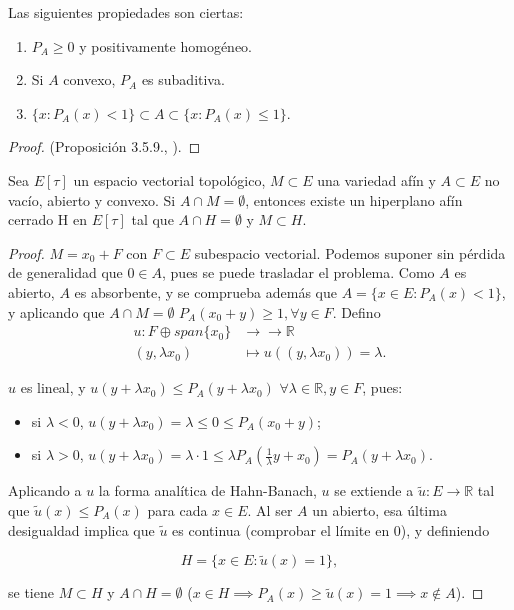 \begin{proposition}
  Las siguientes propiedades son ciertas:
  \begin{enumerate}
    \item $P_A\ge 0$ y positivamente homogéneo.
    \item Si $A$ convexo, $P_A$ es subaditiva.
    \item $\{x:P_A(x)<1\} \subset A \subset \{x:P_A(x)\le 1\}  $.
  \end{enumerate}
\end{proposition}

\begin{proof}
  (Proposición 3.5.9., \cite{cascales2012}).
\end{proof}


\begin{theorem}[Mazur]
  Sea $E[\tau]$ un espacio vectorial topológico, $M\subset E$ una variedad
  afín y $A\subset E$ no vacío, abierto y convexo. Si $A\cap M= \emptyset$,
  entonces existe un hiperplano afín cerrado H en $E[\tau]$ tal que $A\cap
  H=\emptyset$ y $M\subset H$.
\end{theorem}

\begin{proof}
  $M=x_0+F$ con $F\subset E$ subespacio vectorial. Podemos suponer sin pérdida
  de generalidad que $0\in A$, pues se puede trasladar el problema. Como $A$ es
  abierto, $A$ es absorbente, y se comprueba además que $A=\{x\in E:P_A(x)<1\}
  $, y aplicando que $A\cap M=\emptyset$ $P_A(x_0+y)\ge  1, \forall y\in F$.
  Defino 
  \begin{align*}
    u: F\oplus span \{x_0\}  &\longrightarrow \to \mathbb{R} \\
    (y,\lambda x_0) &\longmapsto u((y,\lambda x_0)) = \lambda
  .\end{align*}
  
  $u$ es lineal, y $u(y+\lambda x_0) \le P_A(y+\lambda x_0)$ $\forall \lambda\in
  \mathbb{R},y\in F$, pues:

  \begin{itemize}
    \item si $\lambda < 0$, $u(y+\lambda x_0)=\lambda\le 0\le P_A(x_0+y)$;
    \item si $\lambda > 0$, $u(y+\lambda x_0)=\lambda \cdot 1 \le \lambda
      P_A(\frac{1}{\lambda}y+x_0)=P_A(y+\lambda x_0)$.
  \end{itemize}

  Aplicando a $u$ la forma analítica de Hahn-Banach, $u$ se extiende a
  $\tilde{u}:E\to \mathbb{R}$ tal que $\tilde{u}(x)\le P_A(x)$ para cada $x\in
  E$. Al ser $A$ un abierto, esa última desigualdad implica que $\tilde{u}$ es
  continua (comprobar el límite en $0$), y definiendo

  \[
  H=\{x\in E: \tilde{u}(x)=1\}
  ,\] 

  se tiene $M\subset H$ y $A\cap H=\emptyset$ ($x\in H\implies P_A(x)\ge
  \tilde{u}(x)=1\implies x\not\in A$).
\end{proof}

